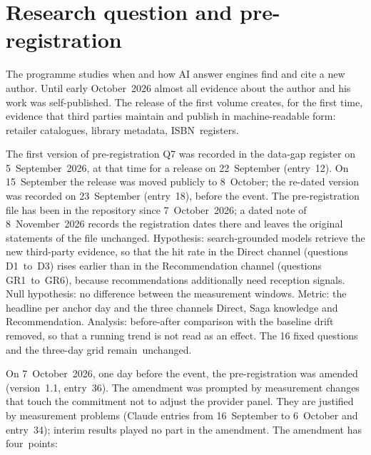 \documentclass[11pt]{article}
\begin{document}
\clearpage
{}\section{Research question and pre-registration}

The programme studies when and how AI answer engines find and cite a new author. Until early October~2026 almost all evidence about the author and his work was self-published. The release of the first volume creates, for the first time, evidence that third parties maintain and publish in machine-readable form: retailer catalogues, library metadata, ISBN~\mbox{registers.}

The first version of pre-registration Q7 was recorded in the data-gap register on 5~September~2026, at that time for a release on 22~September (entry~12). On 15~September the release was moved publicly to 8~October; the re-dated version was recorded on 23~September (entry~18), before the event. The pre-registration file has been in the repository since 7~October~2026; a dated note of 8~November~2026 records the registration dates there and leaves the original statements of the file unchanged. Hypothesis: search-grounded models retrieve the new third-party evidence, so that the hit rate in the Direct channel (questions D1~to~D3) rises earlier than in the Recommendation channel (questions GR1~to~GR6), because recommendations additionally need reception signals. Null hypothesis: no difference between the measurement windows. Metric: the headline per anchor day and the three channels Direct, Saga knowledge and Recommendation. Analysis: before-after comparison with the baseline drift removed, so that a running trend is not read as an effect. The 16 fixed questions and the three-day grid remain~\mbox{unchanged.}

On 7~October~2026, one day before the event, the pre-registration was amended (version~1.1, entry~36). The amendment was prompted by measurement changes that touch the commitment not to adjust the provider panel. They are justified by measurement problems (Claude entries from 16~September to 6~October and entry~34); interim results played no part in the amendment. The amendment has four~\mbox{points:}
\end{document}
